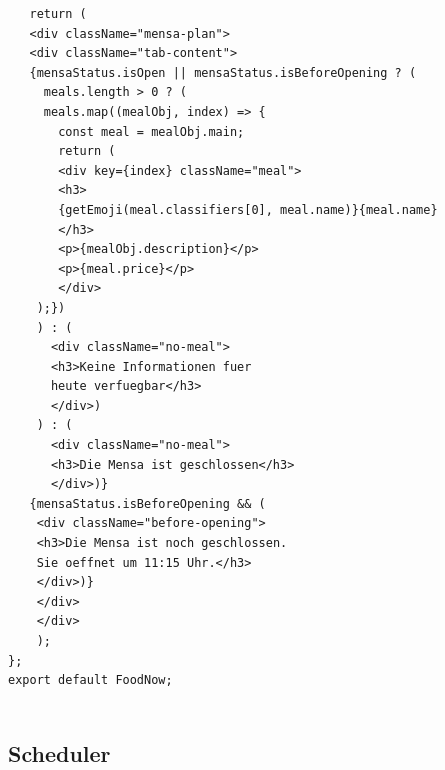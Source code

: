 \begin{lstlisting}
   return (
   <div className="mensa-plan">
   <div className="tab-content">
   {mensaStatus.isOpen || mensaStatus.isBeforeOpening ? (
   	 meals.length > 0 ? (
   	 meals.map((mealObj, index) => {
   	   const meal = mealObj.main;
   	   return (
   	   <div key={index} className="meal">
   	   <h3>
   	   {getEmoji(meal.classifiers[0], meal.name)}{meal.name}
   	   </h3>
   	   <p>{mealObj.description}</p>
   	   <p>{meal.price}</p>
   	   </div>
	);})
	) : (
	  <div className="no-meal">
	  <h3>Keine Informationen fuer 
	  heute verfuegbar</h3>
	  </div>)
	) : (
	  <div className="no-meal">
	  <h3>Die Mensa ist geschlossen</h3>
	  </div>)}
   {mensaStatus.isBeforeOpening && (
   	<div className="before-opening">
   	<h3>Die Mensa ist noch geschlossen. 
   	Sie oeffnet um 11:15 Uhr.</h3>
   	</div>)}
	</div>
	</div>
	);
};
export default FoodNow;
	
\end{lstlisting}
\newpage
\subsection{Scheduler}
